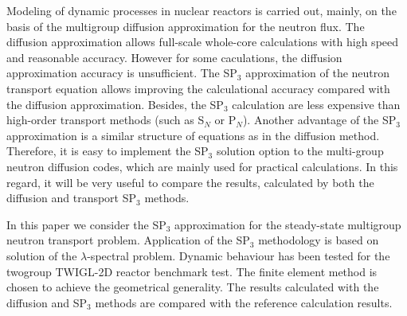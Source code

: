 \documentclass{crm-article}
\begin{document}
\begin{abstracteng}
Modeling of dynamic processes in nuclear reactors is carried out, mainly, on the basis of the multigroup diffusion approximation for the neutron flux.
The diffusion approximation allows full-scale whole-core calculations with high speed and reasonable accuracy. However for some caculations, the diffusion approximation accuracy is unsufficient. 
The SP$_3$ approximation of the neutron transport equation allows improving the calculational accuracy compared with the diffusion approximation. 
Besides, the SP$_3$ calculation are less expensive than high-order transport methods (such as S$_N$ or P$_N$). 
Another advantage of the SP$_3$ approximation is a similar structure of equations as in the diffusion method. 
Therefore, it is easy to implement the SP$_3$ solution option to the multi-group neutron diffusion codes, which are mainly used for practical calculations. 
In this regard, it will be very useful to compare the results, calculated by both the diffusion and transport SP$_3$ methods.

In this paper we consider the SP$_3$ approximation for the steady-state multigroup neutron transport problem.
Application of the SP$_3$ methodology is based on solution of the $\lambda$-spectral problem. 
Dynamic behaviour has been tested for the twogroup TWIGL-2D reactor benchmark test. 
The finite element method is chosen to achieve the geometrical generality. 
The results calculated with the diffusion and SP$_3$ methods are compared with the reference calculation results. 
\end{abstracteng}



\maketitle

\end{document}
